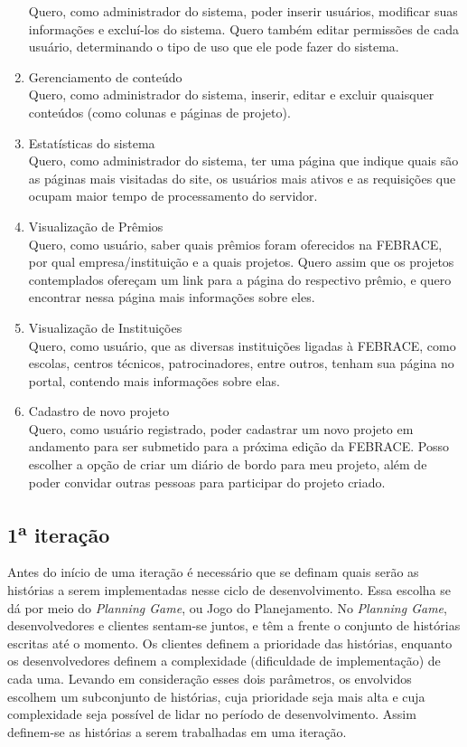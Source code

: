 \begin{enumerate}
      Quero, como administrador do sistema, poder inserir usuários, modificar suas informações e excluí-los do sistema. Quero também editar permissões de cada usuário, determinando o tipo de uso que ele pode fazer do sistema.
    \item Gerenciamento de conteúdo \\
      Quero, como administrador do sistema, inserir, editar e excluir quaisquer conteúdos (como colunas e páginas de projeto).
    \item Estatísticas do sistema \\
      Quero, como administrador do sistema, ter uma página que indique quais são as páginas mais visitadas do site, os usuários mais ativos e as requisições que ocupam maior tempo de processamento do servidor.
    \item Visualização de Prêmios \\
      Quero, como usuário, saber quais prêmios foram oferecidos na FEBRACE, por qual empresa/instituição e a quais projetos. Quero assim que os projetos contemplados ofereçam um link para a página do respectivo prêmio, e quero encontrar nessa página mais informações sobre eles.
    \item Visualização de Instituições \\
      Quero, como usuário, que as diversas instituições ligadas à FEBRACE, como escolas, centros técnicos, patrocinadores, entre outros, tenham sua página no portal, contendo mais informações sobre elas.
    \item Cadastro de novo projeto \\
      Quero, como usuário registrado, poder cadastrar um novo projeto em andamento para ser submetido para a próxima edição da FEBRACE. Posso escolher a opção de criar um diário de bordo para meu projeto, além de poder convidar outras pessoas para participar do projeto criado.
	\end{enumerate}

  \subsection{1\textsuperscript{a} iteração}
    Antes do início de uma iteração é necessário que se definam quais serão as histórias a serem implementadas nesse ciclo de desenvolvimento. Essa escolha se dá por meio do \textit{Planning Game}, ou Jogo do Planejamento. No \textit{Planning Game}, desenvolvedores e clientes sentam-se juntos, e têm a frente o conjunto de histórias escritas até o momento. Os clientes definem a prioridade das histórias, enquanto os desenvolvedores definem a complexidade (dificuldade de implementação) de cada uma. Levando em consideração esses dois parâmetros, os envolvidos escolhem um subconjunto de histórias, cuja prioridade seja mais alta e cuja complexidade seja possível de lidar no período de desenvolvimento. Assim definem-se as histórias a serem trabalhadas em uma iteração.

